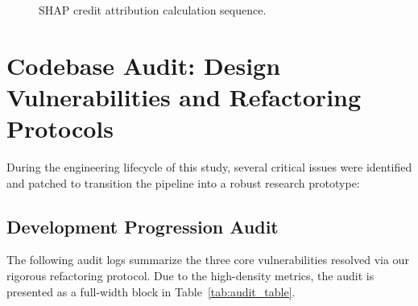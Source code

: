 \documentclass[journal,10pt]{IEEEtran}
\begin{document}
\begin{figure}[htbp]
\centering
{}
\caption{SHAP credit attribution calculation sequence.}
\label{fig:shap_attribution}
\end{figure}

\section{Codebase Audit: Design Vulnerabilities and Refactoring Protocols}
During the engineering lifecycle of this study, several critical issues were identified and patched to transition the pipeline into a robust research prototype:

\subsection{Development Progression Audit}
The following audit logs summarize the three core vulnerabilities resolved via our rigorous refactoring protocol. Due to the high-density metrics, the audit is presented as a full-width block in Table~\ref{tab:audit_table}.
\end{document}

